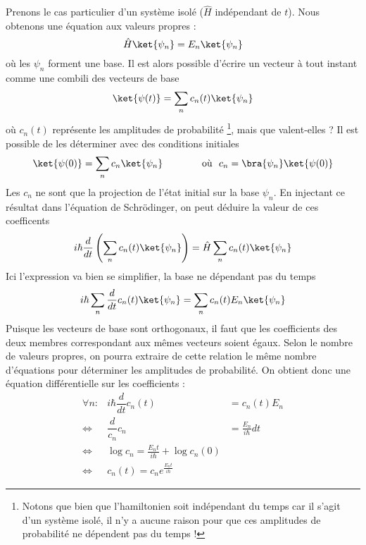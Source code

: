 Prenons le cas particulier d'un système isolé ($\hat{H}$ indépendant de $t$).
Nous obtenons une équation aux valeurs propres :
\begin{equation}
\hat{H}\ket{\psi_n} = E_n\ket{\psi_n}
\end{equation}
où les $\psi_n$ forment une base. Il est alors possible d'écrire un vecteur à tout 
instant comme une combili des vecteurs de base
\begin{equation}
\ket{\psi(t)} = \sum_n c_n(t)\ket{\psi_n}
\end{equation}
où $c_n(t)$ représente les amplitudes de probabilité \footnote{Notons que bien que l'hamiltonien
soit indépendant du temps car il s'agit d'un système isolé, il n'y a aucune raison pour que ces
amplitudes de probabilité ne dépendent pas du temps !}, mais que valent-elles ? Il est 
possible de les déterminer avec des conditions initiales
\begin{equation}
\ket{\psi(0)} = \sum_n c_n\ket{\psi_n}\qquad\qquad \text{où }\ c_n = \bra{\psi_n}\ket{\psi(0)}
\end{equation}
Les $c_n$ ne sont que la projection de l'état initial sur la base $\psi_n$. En injectant ce 
résultat dans l'équation de Schrödinger, on peut déduire la valeur de ces coefficents
\begin{equation}
i\hbar\dfrac{d}{dt}\left(\sum_n c_n(t)\ket{\psi_n}\right) = \hat{H}\sum_n c_n(t)\ket{\psi_n}
\end{equation}
Ici l'expression va bien se simplifier, la base ne dépendant pas du temps
\begin{equation}
i\hbar \sum_n \dfrac{d}{dt}c_n(t)\ket{\psi_n} = \sum_n c_n(t)E_n\ket{\psi_n}
\end{equation}
Puisque les vecteurs de base sont orthogonaux, il faut que les coefficients
des deux membres correspondant aux mêmes vecteurs soient égaux.
Selon le nombre de valeurs propres, on pourra extraire de cette relation le même nombre 
d'équations pour déterminer les amplitudes de probabilité.
On obtient donc une équation différentielle sur les coefficients :
\begin{equation}
\begin{array}{lll}
\forall n: &i\hbar \dfrac{d}{dt}c_n(t) &= c_n(t)E_n\\
 \Leftrightarrow & \dfrac{d}{c_n}c_n &= \frac{E_n}{i\hbar}dt\\
 \Leftrightarrow & \log c_n = \frac{E_nt}{i\hbar} + \log c_n(0)\\
 \Leftrightarrow & c_n(t) = c_n e^{\frac{E_nt}{i\hbar}}
\end{array}
\end{equation}
